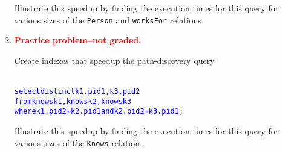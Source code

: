 \documentclass{article}
\begin{document}
\begin{enumerate}[resume]
Illustrate this speedup by finding the execution times for this query for various sizes of the {\tt Person} and {\tt worksFor} relations.

\item \textcolor{red}{\bf Practice problem--not graded.}

Create indexes that speedup the path-discovery query
\begin{alltt}\textcolor{blue}{
select distinct k1.pid1, k3.pid2
from   knows k1, knows k2, knows k3 
where  k1.pid2 = k2.pid1 and k2.pid2 = k3.pid1;}
\end{alltt}
Illustrate this speedup by finding the execution times for this query for various sizes of the {\tt Knows} relation.
\end{enumerate}
\end{document}
